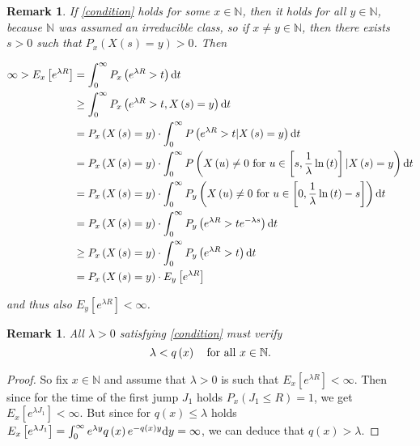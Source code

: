 \documentclass[12pt,a4paper]{scrartcl}
\newtheorem {remark}[theorem]{Remark}
\numberwithin{equation}{section}
\newcommand{\N}{\mathbb{N}} %
\begin{document}
\begin{remark} \label{independentofx}
If \eqref{condition} holds for some $x \in \N$, then it holds for all $y \in \N$, because $\N$ was assumed an irreducible class, so if $ x \neq y \in \N $, then there exists $ s > 0 $ such that $P_x\left(X\left(s\right)=y\right) > 0 $. Then

\begin{align*}
\infty > E_x\left[e^{\lambda R}\right] &= \int_0^{\infty} P_x\left(e^{\lambda R} > t \right) \textnormal{d}t \\
&\geq  \int_0^{\infty} P_x\left(e^{\lambda R} > t, X\left(s\right) = y \right) \textnormal{d}t \\
&= P_x\left(X\left(s\right) = y \right) \cdot \int_0^{\infty} P\left(e^{\lambda R} > t | X\left(s\right) = y \right) \textnormal{d}t \\
&= P_x\left(X\left(s\right) = y \right) \cdot \int_0^{\infty} P\left(X\left(u\right) \neq 0 \text{ for  } u \in \left[s,\frac{1}{\lambda} \ln\left(t\right) \right] | X\left(s\right) = y \right) \textnormal{d}t \\
&= P_x\left(X\left(s\right) = y \right) \cdot \int_0^{\infty} P_y\left(X\left(u\right) \neq 0 \text{ for  } u \in \left[0,\frac{1}{\lambda} \ln\left(t\right) - s \right] \right) \textnormal{d}t \\
&= P_x\left(X\left(s\right) = y \right) \cdot \int_0^{\infty} P_y\left( e^{\lambda R} > t e^{-\lambda s} \right) \textnormal{d}t \\
& \geq P_x\left(X\left(s\right) = y \right) \cdot \int_0^{\infty} P_y\left( e^{\lambda R} > t \right) \textnormal{d}t \\
&= P_x\left(X\left(s\right) = y \right) \cdot E_y\left[e^{\lambda R}\right]
\end{align*}

and thus also $E_y\left[e^{\lambda R}\right] < \infty $.

\end{remark}

\begin{remark}
All $ \lambda > 0$ satisfying \eqref{condition} must verify 
$$ \lambda < q\left(x\right) \ \ \textnormal{ for all } x \in \N. $$
\end{remark}
\begin{proof}
So fix $x \in \N$ and assume that $\lambda > 0$ is such that $E_x\left[e^{\lambda R} \right] < \infty. $ Then since for the time of the first jump $J_1$ holds $P_x\left(J_1 \leq R \right) = 1$, we get $E_x\left[e^{\lambda J_1} \right] < \infty.$ But since for $q\left(x\right) \leq \lambda $ holds $E_x\left[e^{\lambda J_1} \right] = \int_0^{\infty} e^{\lambda y} q\left(x\right) e^{-q\left(x\right) y} \textnormal{d}y = \infty$, we can deduce that $q\left(x\right) > \lambda.$
\end{proof}
\end{document}
